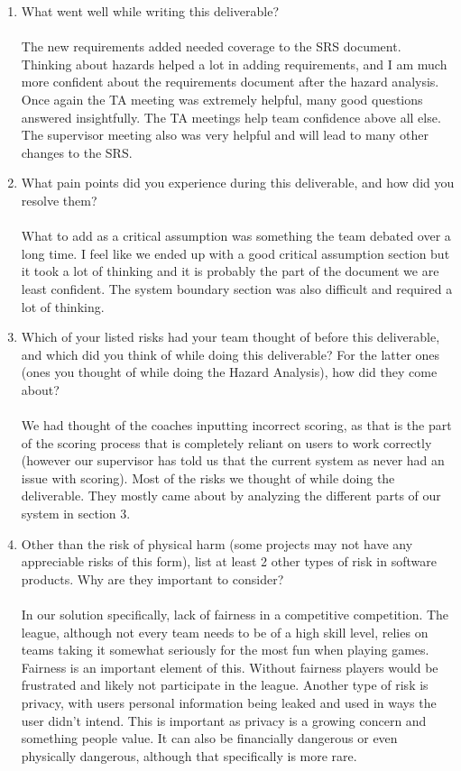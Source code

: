 \documentclass{article}
\begin{document}
\begin{enumerate}
  \item What went well while writing this deliverable?\\\\
  The new requirements added needed coverage to the SRS document. Thinking
  about hazards helped a lot in adding requirements, and I am much more
  confident about the requirements document after the hazard analysis. Once
  again the TA meeting was extremely helpful, many good questions answered
  insightfully. The TA meetings help team confidence above all else. The
  supervisor meeting also was very helpful and will lead to many other changes
  to the SRS.

  \item What pain points did you experience during this deliverable, and how
  did you resolve them?\\\\
  What to add as a critical assumption was something the team debated over a
  long time. I feel like we ended up with a good critical assumption section
  but it took a lot of thinking and it is probably the part of the document
  we are least confident. The system boundary section was also difficult and
  required a lot of thinking.

  \item Which of your listed risks had your team thought of before this
  deliverable, and which did you think of while doing this deliverable? For
  the latter ones (ones you thought of while doing the Hazard Analysis), how
  did they come about?\\\\
  We had thought of the coaches inputting incorrect scoring, as that is the
  part of the scoring process that is completely reliant on users to work
  correctly (however our supervisor has told us that the current system as
  never had an issue with scoring). Most of the risks we thought of while
  doing the deliverable. They mostly came about by analyzing the different
  parts of our system in section 3.

  \item Other than the risk of physical harm (some projects may not have any
  appreciable risks of this form), list at least 2 other types of risk in
  software products. Why are they important to consider?\\\\
  In our solution specifically, lack of fairness in a competitive competition.
  The league, although not every team needs to be of a high skill level,
  relies on teams taking it somewhat seriously for the most fun when playing
  games. Fairness is an important element of this. Without fairness players
  would be frustrated and likely not participate in the league. Another type
  of risk is privacy, with users personal information being leaked and used in
  ways the user didn't intend. This is important as privacy is a growing
  concern and something people value. It can also be financially dangerous or
  even physically dangerous, although that specifically is more rare.

\end{enumerate}
\end{document}
